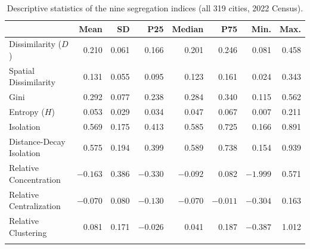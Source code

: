 \begin{table}[h]
\caption{Descriptive statistics of the nine segregation indices (all 319 cities, 2022 Census).}\label{tab:summary}%
\small
\begin{tabular}{@{}lrrrrrrr@{}}
\toprule
 & Mean & SD & P25 & Median & P75 & Min. & Max. \\
\midrule
Dissimilarity ($D$)      & 0.210 & 0.061 & 0.166 & 0.201 & 0.246 & 0.081 & 0.458 \\
Spatial Dissimilarity    & 0.131 & 0.055 & 0.095 & 0.123 & 0.161 & 0.024 & 0.343 \\
Gini                     & 0.292 & 0.077 & 0.238 & 0.284 & 0.340 & 0.115 & 0.562 \\
Entropy ($H$)            & 0.053 & 0.029 & 0.034 & 0.047 & 0.067 & 0.007 & 0.211 \\
Isolation                & 0.569 & 0.175 & 0.413 & 0.585 & 0.725 & 0.166 & 0.891 \\
Distance-Decay Isolation & 0.575 & 0.194 & 0.399 & 0.589 & 0.738 & 0.154 & 0.939 \\
Relative Concentration   & $-0.163$ & 0.386 & $-0.330$ & $-0.092$ & 0.082 & $-1.999$ & 0.571 \\
Relative Centralization  & $-0.070$ & 0.080 & $-0.130$ & $-0.070$ & $-0.011$ & $-0.304$ & 0.163 \\
Relative Clustering      & 0.081 & 0.171 & $-0.026$ & 0.041 & 0.187 & $-0.387$ & 1.012 \\
\botrule
\end{tabular}
\end{table}
